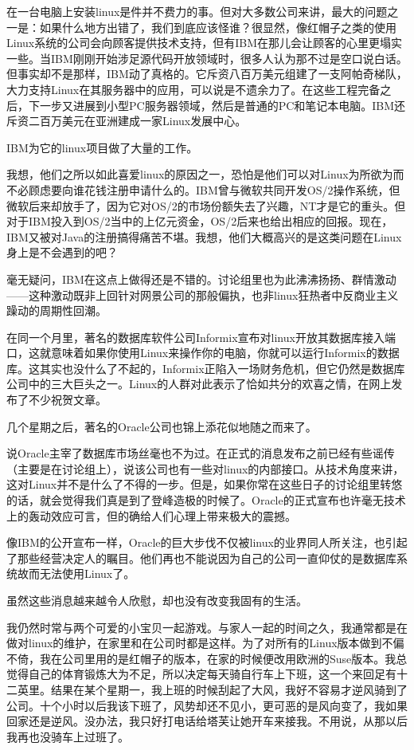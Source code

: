 在一台电脑上安装linux是件并不费力的事。但对大多数公司来讲，最大的问题之一是：如果什么地方出错了，我们到底应该怪谁？很显然，像红帽子之类的使用Linux系统的公司会向顾客提供技术支持，但有IBM在那儿会让顾客的心里更塌实一些。当IBM刚刚开始涉足源代码开放领域时，很多人认为那不过是空口说白话。但事实却不是那样，IBM动了真格的。它斥资八百万美元组建了一支阿帕奇梯队，大力支持Linux在其服务器中的应用，可以说是不遗余力了。在这些工程完备之后，下一步又进展到小型PC服务器领域，然后是普通的PC和笔记本电脑。IBM还斥资二百万美元在亚洲建成一家Linux发展中心。

IBM为它的linux项目做了大量的工作。

我想，他们之所以如此喜爱linux的原因之一，恐怕是他们可以对Linux为所欲为而不必顾虑要向谁花钱注册申请什么的。IBM曾与微软共同开发OS/2操作系统，但微软后来却放手了，因为它对OS/2的市场份额失去了兴趣，NT才是它的重头。但对于IBM投入到OS/2当中的上亿元资金，OS/2后来也给出相应的回报。现在，IBM又被对Java的注册搞得痛苦不堪。我想，他们大概高兴的是这类问题在Linux身上是不会遇到的吧？

毫无疑问，IBM在这点上做得还是不错的。讨论组里也为此沸沸扬扬、群情激动——这种激动既非上回针对网景公司的那般偏执，也非linux狂热者中反商业主义躁动的周期性回潮。

在同一个月里，著名的数据库软件公司Informix宣布对linux开放其数据库接入端口，这就意味着如果你使用Linux来操作你的电脑，你就可以运行Informix的数据库。这其实也没什么了不起的，Informix正陷入一场财务危机，但它仍然是数据库公司中的三大巨头之一。Linux的人群对此表示了恰如共分的欢喜之情，在网上发布了不少祝贺文章。

几个星期之后，著名的Oracle公司也锦上添花似地随之而来了。

说Oracle主宰了数据库市场丝毫也不为过。在正式的消息发布之前已经有些谣传（主要是在讨论组上），说该公司也有一些对linux的内部接口。从技术角度来讲，这对Linux并不是什么了不得的一步。但是，如果你常在这些日子的讨论组里转悠的话，就会觉得我们真是到了登峰造极的时候了。Oracle的正式宣布也许毫无技术上的轰动效应可言，但的确给人们心理上带来极大的震撼。

像IBM的公开宣布一样，Oracle的巨大步伐不仅被linux的业界同人所关注，也引起了那些经营决定人的瞩目。他们再也不能说因为自己的公司一直仰仗的是数据库系统故而无法使用Linux了。

虽然这些消息越来越令人欣慰，却也没有改变我固有的生活。

我仍然时常与两个可爱的小宝贝一起游戏。与家人一起的时间之久，我通常都是在做对linux的维护，在家里和在公司时都是这样。为了对所有的Linux版本做到不偏不倚，我在公司里用的是红帽子的版本，在家的时候便改用欧洲的Suse版本。我总觉得自己的体育锻炼大为不足，所以决定每天骑自行车上下班，这一个来回足有十二英里。结果在某个星期一，我上班的时候刮起了大风，我好不容易才逆风骑到了公司。十个小时以后我该下班了，风势却还不见小，更可恶的是风向变了，我如果回家还是逆风。没办法，我只好打电话给塔芙让她开车来接我。不用说，从那以后我再也没骑车上过班了。

